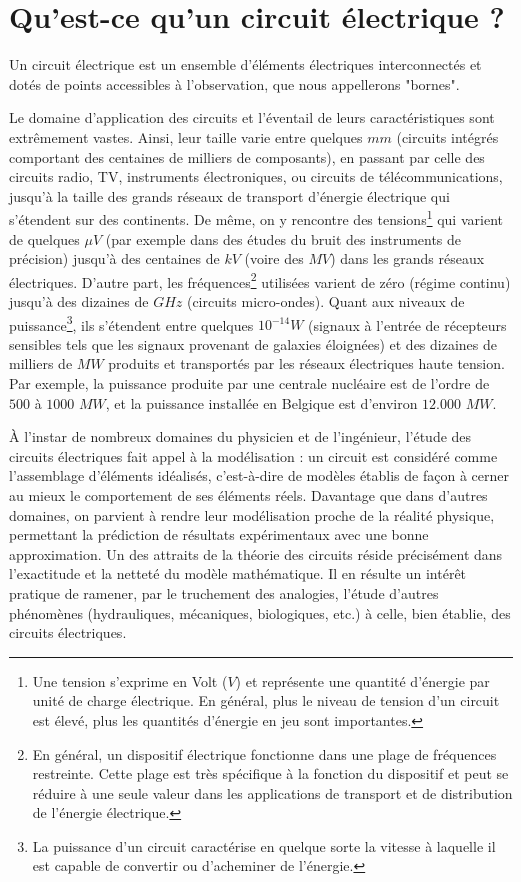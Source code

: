 \section{Qu'est-ce qu'un circuit électrique ?}

Un circuit électrique est un ensemble d'éléments électriques interconnectés et dotés de points accessibles à l'observation, que nous appellerons "bornes".

Le domaine d'application des circuits et l'éventail de leurs caractéristiques sont extrêmement vastes. Ainsi, leur taille varie entre quelques $mm$ (circuits intégrés comportant des centaines de milliers de composants), en passant par celle des circuits radio, TV, instruments électroniques, ou circuits de télécommunications, jusqu'à la taille des grands réseaux de transport d'énergie électrique qui s'étendent sur des continents. De même, on y rencontre des tensions\footnote{Une tension s'exprime en Volt ($V$) et représente une quantité d'énergie par unité de charge électrique. En général, plus le niveau de tension d'un circuit est élevé, plus les quantités d'énergie en jeu sont importantes.} qui varient de quelques $\mu V$ (par exemple dans des études du bruit des instruments de précision) jusqu'à des centaines de $kV$ (voire des $MV$) dans les grands réseaux électriques. D'autre part, les fréquences\footnote{En général, un dispositif électrique fonctionne dans une plage de fréquences restreinte. Cette plage est très spécifique à la fonction du dispositif et peut se réduire à une seule valeur dans les applications de transport et de distribution de l'énergie électrique.} utilisées varient de zéro (régime continu) jusqu'à des dizaines de $GHz$ (circuits micro-ondes). Quant aux niveaux de puissance\footnote{La puissance d'un circuit caractérise en quelque sorte la vitesse à laquelle il est capable de convertir ou d'acheminer de l'énergie.}, ils s'étendent entre quelques $10^{-14} W$ (signaux à l'entrée de récepteurs sensibles tels que les signaux provenant de galaxies éloignées) et des dizaines de milliers de $MW$ produits et transportés par les réseaux électriques haute tension. Par exemple, la puissance produite par une centrale nucléaire est de l'ordre de $500$ à $1000$ $MW$, et la puissance installée en Belgique est d'environ $12.000$ $MW$. 

À l'instar de nombreux domaines du physicien et de l'ingénieur, l'étude des circuits électriques fait appel à la modélisation : un circuit est considéré comme l'assemblage d'éléments idéalisés, c'est-à-dire de modèles établis de façon à cerner au mieux le comportement de ses éléments réels. Davantage que dans d'autres domaines, on parvient à rendre leur modélisation proche de la réalité physique, permettant la prédiction de résultats expérimentaux avec une bonne approximation. Un des attraits de la théorie des circuits réside précisément dans l'exactitude et la netteté du modèle mathématique. Il en résulte un intérêt pratique de ramener, par le truchement des analogies, l'étude d'autres phénomènes (hydrauliques, mécaniques, biologiques, etc.) à celle, bien établie, des circuits électriques. 

